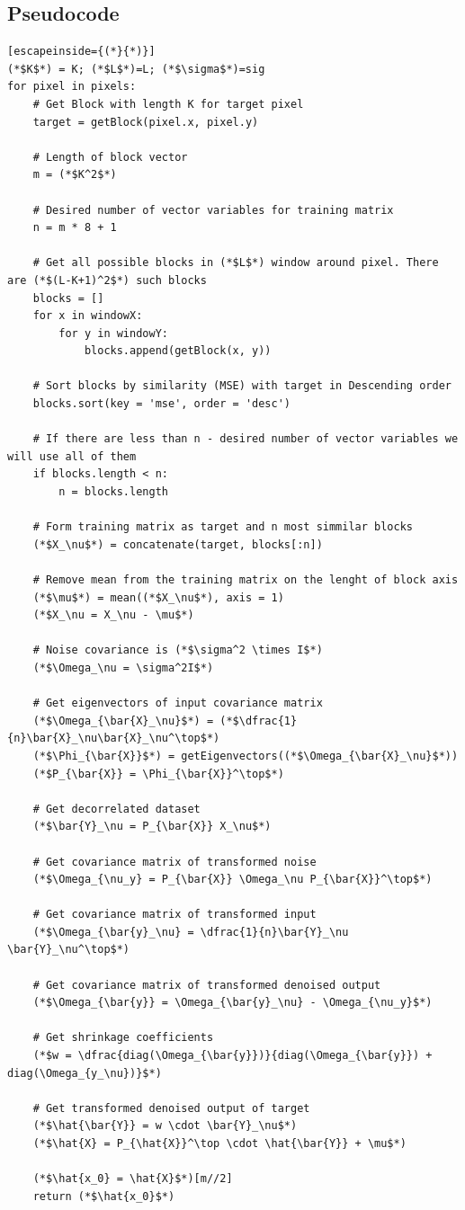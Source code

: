 \subsection{Pseudocode}
\begin{lstlisting}[escapeinside={(*}{*)}]
(*$K$*) = K; (*$L$*)=L; (*$\sigma$*)=sig
for pixel in pixels:
    # Get Block with length K for target pixel
    target = getBlock(pixel.x, pixel.y)
    
    # Length of block vector
    m = (*$K^2$*)
    
    # Desired number of vector variables for training matrix
    n = m * 8 + 1 

    # Get all possible blocks in (*$L$*) window around pixel. There are (*$(L-K+1)^2$*) such blocks
    blocks = []
    for x in windowX: 
        for y in windowY:
            blocks.append(getBlock(x, y))
    
    # Sort blocks by similarity (MSE) with target in Descending order
    blocks.sort(key = 'mse', order = 'desc')

    # If there are less than n - desired number of vector variables we will use all of them
    if blocks.length < n:
        n = blocks.length
    
    # Form training matrix as target and n most simmilar blocks
    (*$X_\nu$*) = concatenate(target, blocks[:n])

    # Remove mean from the training matrix on the lenght of block axis
    (*$\mu$*) = mean((*$X_\nu$*), axis = 1)
    (*$X_\nu = X_\nu - \mu$*)

    # Noise covariance is (*$\sigma^2 \times I$*)
    (*$\Omega_\nu = \sigma^2I$*)

    # Get eigenvectors of input covariance matrix
    (*$\Omega_{\bar{X}_\nu}$*) = (*$\dfrac{1}{n}\bar{X}_\nu\bar{X}_\nu^\top$*)
    (*$\Phi_{\bar{X}}$*) = getEigenvectors((*$\Omega_{\bar{X}_\nu}$*))
    (*$P_{\bar{X}} = \Phi_{\bar{X}}^\top$*)
    
    # Get decorrelated dataset
    (*$\bar{Y}_\nu = P_{\bar{X}} X_\nu$*)

    # Get covariance matrix of transformed noise
    (*$\Omega_{\nu_y} = P_{\bar{X}} \Omega_\nu P_{\bar{X}}^\top$*)

    # Get covariance matrix of transformed input
    (*$\Omega_{\bar{y}_\nu} = \dfrac{1}{n}\bar{Y}_\nu \bar{Y}_\nu^\top$*)
    
    # Get covariance matrix of transformed denoised output
    (*$\Omega_{\bar{y}} = \Omega_{\bar{y}_\nu} - \Omega_{\nu_y}$*)
    
    # Get shrinkage coefficients
    (*$w = \dfrac{diag(\Omega_{\bar{y}})}{diag(\Omega_{\bar{y}}) + diag(\Omega_{y_\nu})}$*)
    
    # Get transformed denoised output of target
    (*$\hat{\bar{Y}} = w \cdot \bar{Y}_\nu$*)
    (*$\hat{X} = P_{\hat{X}}^\top \cdot \hat{\bar{Y}} + \mu$*)
    
    (*$\hat{x_0} = \hat{X}$*)[m//2]
    return (*$\hat{x_0}$*)
\end{lstlisting}

